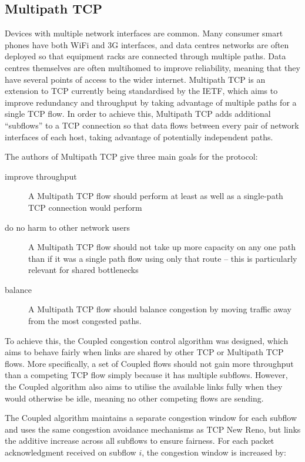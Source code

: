 \subsection{Multipath TCP}

Devices with multiple network interfaces are common. Many consumer smart phones
have both WiFi and 3G interfaces, and data centres networks are often deployed
so that equipment racks are connected through multiple paths. Data centres
themselves are often multihomed to improve reliability, meaning that they have
several points of access to the wider internet. Multipath TCP is an extension to
TCP currently being standardised by the IETF, which aims to improve redundancy
and throughput by taking advantage of multiple paths for a single TCP flow. In
order to achieve this, Multipath TCP adds additional ``subflows'' to a TCP
connection so that data flows between every pair of network interfaces of each
host, taking advantage of potentially independent paths.

The authors of Multipath TCP give three main goals for the protocol:

\begin{description}
  \item[improve throughput] A Multipath TCP flow should perform at least as well
    as a single-path TCP connection would perform
  \item[do no harm to other network users] A Multipath TCP flow should not take
    up more capacity on any one path than if it was a single path flow using
    only that route -- this is particularly relevant for shared bottlenecks
  \item[balance] A Multipath TCP flow should balance congestion by moving
    traffic away from the most congested paths.
\end{description}

To achieve this, the Coupled congestion control algorithm was designed, which
aims to behave fairly when links are shared by other TCP or Multipath TCP flows.
More specifically, a set of Coupled flows should not gain more throughput than a
competing TCP flow simply because it has multiple subflows. However, the Coupled
algorithm also aims to utilise the available links fully when they would
otherwise be idle, meaning no other competing flows are sending.

The Coupled algorithm maintains a separate congestion window for each subflow
and uses the same congestion avoidance mechanisms as TCP New Reno, but links the
additive increase across all subflows to ensure fairness. For each packet
acknowledgment received on subflow $i$, the congestion window is increased by:

